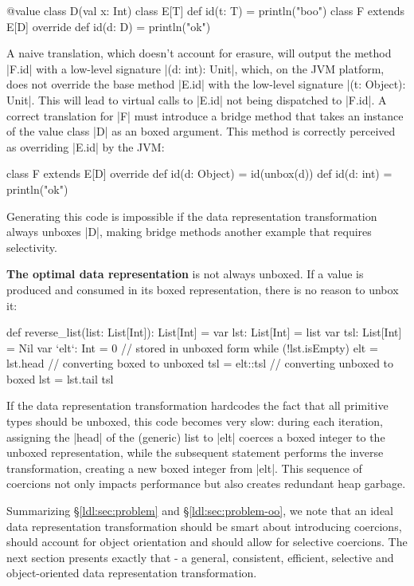 \begin{lstlisting-nobreak}
 @value class D(val x: Int)
 class E[T] {
   def id(t: T) = println("boo")
 }
 class F extends E[D] {
   override def id(d: D) = println("ok")
 }
\end{lstlisting-nobreak}

A naive translation, which doesn't account for erasure, will output the method |F.id| with a low-level signature |(d: int): Unit|, which, on the JVM platform, does not override the base method |E.id| with the low-level signature |(t: Object): Unit|. This will lead to virtual calls to |E.id| not being dispatched to |F.id|. A correct translation for |F| must introduce a bridge method that takes an instance of the value class |D| as an boxed argument. This method is correctly perceived as overriding |E.id| by the JVM:

\begin{lstlisting-nobreak}
 class F extends E[D] {
   override def id(d: Object) = id(unbox(d))
   def id(d: int) = println("ok")
 }
\end{lstlisting-nobreak}

Generating this code is impossible if the data representation transformation always unboxes |D|, making bridge methods another example that requires selectivity.

\textbf{The optimal data representation} is not always unboxed. If a value is produced and consumed in its boxed representation, there is no reason to unbox it:

\begin{lstlisting-nobreak}
 def reverse_list(list: List[Int]): List[Int] = {
   var lst: List[Int] = list
   var tsl: List[Int] = Nil
   var `elt`: Int = 0 // stored in unboxed form
   while (!lst.isEmpty) {
     elt = lst.head // converting boxed to unboxed
     tsl = elt::tsl // converting unboxed to boxed
     lst = lst.tail
   }
   tsl
 }
\end{lstlisting-nobreak}

If the data representation transformation hardcodes the fact that all primitive types should be unboxed, this code becomes very slow: during each iteration, assigning the |head| of the (generic) list to |elt| coerces a boxed integer to the unboxed representation, while the subsequent statement performs the inverse transformation, creating a new boxed integer from |elt|. This sequence of coercions not only impacts performance but also creates redundant heap garbage.

Summarizing \S\ref{ldl:sec:problem} and \S\ref{ldl:sec:problem-oo}, we note that an ideal data representation transformation should be smart about introducing coercions, should account for object orientation and should allow for selective coercions. The next section presents exactly that - a general, consistent, efficient, selective and object-oriented data representation transformation.

